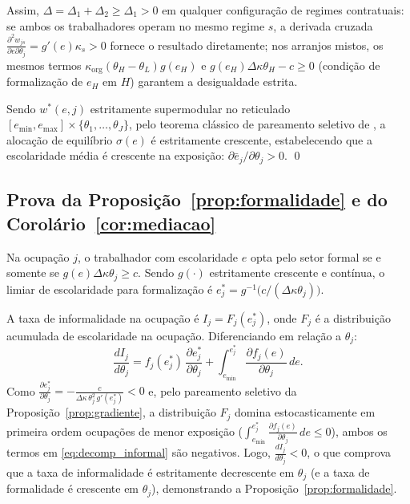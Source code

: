 Assim, $\Delta = \Delta_1 + \Delta_2 \ge \Delta_1 > 0$ em qualquer configuração de regimes contratuais: se ambos os trabalhadores operam no mesmo regime $s$, a derivada cruzada $\frac{\partial^2 w_{js}}{\partial e \partial \theta_j} = g'(e)\kappa_s > 0$ fornece o resultado diretamente; nos arranjos mistos, os mesmos termos $\kappa_{\text{org}}(\theta_H - \theta_L)g(e_H)$ e $g(e_H)\Delta\kappa\theta_H - c \ge 0$ (condição de formalização de $e_H$ em $H$) garantem a desigualdade estrita.

Sendo $w^*(e, j)$ estritamente supermodular no reticulado $[e_{\min}, e_{\max}] \times \{\theta_1, \dots, \theta_J\}$, pelo teorema clássico de pareamento seletivo de \citet{becker1973theory}, a alocação de equilíbrio $\sigma(e)$ é estritamente crescente, estabelecendo que a escolaridade média é crescente na exposição: $\partial \bar{e}_j / \partial \theta_j > 0$. \qed

\subsection{Prova da Proposição~\ref{prop:formalidade} e do Corolário~\ref{cor:mediacao}}

Na ocupação $j$, o trabalhador com escolaridade $e$ opta pelo setor formal se e somente se $g(e)\Delta\kappa\theta_j \ge c$. Sendo $g(\cdot)$ estritamente crescente e contínua, o limiar de escolaridade para formalização é $e^*_j = g^{-1}\big(c / (\Delta\kappa \theta_j)\big)$.

A taxa de informalidade na ocupação é $I_j = F_j(e^*_j)$, onde $F_j$ é a distribuição acumulada de escolaridade na ocupação. Diferenciando em relação a $\theta_j$:
\begin{equation}
    \frac{d I_j}{d \theta_j} = f_j(e^*_j) \, \frac{\partial e^*_j}{\partial \theta_j}
    + \int_{e_{\min}}^{e^*_j} \frac{\partial f_j(e)}{\partial \theta_j} \, de.
    \label{eq:decomp_informal}
\end{equation}
Como $\frac{\partial e^*_j}{\partial \theta_j} = -\frac{c}{\Delta\kappa \, \theta_j^2 \, g'(e^*_j)} < 0$ e, pelo pareamento seletivo da Proposição~\ref{prop:gradiente}, a distribuição $F_j$ domina estocasticamente em primeira ordem ocupações de menor exposição ($\int_{e_{\min}}^{e^*_j} \frac{\partial f_j(e)}{\partial \theta_j} \, de \le 0$), ambos os termos em \eqref{eq:decomp_informal} são negativos. Logo, $\frac{d I_j}{d \theta_j} < 0$, o que comprova que a taxa de informalidade é estritamente decrescente em $\theta_j$ (e a taxa de formalidade é crescente em $\theta_j$), demonstrando a Proposição~\ref{prop:formalidade}.

